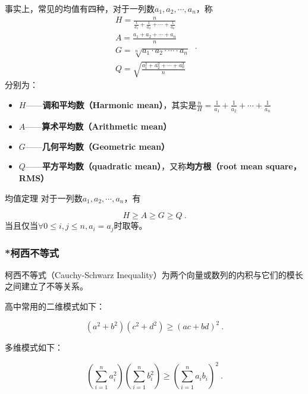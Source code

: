 事实上，常见的均值有四种，对于一列数$a_1,a_2,\cdots,a_n$，称
\begin{equation}
\begin{array}{c} 
\displaystyle H = \frac{n}{\frac{1}{a_1} + \frac{1}{a_2} + \cdots + \frac{1}{a_n}}\\
\displaystyle A = \frac{a_1 + a_2 + \cdots + a_n}{n}\\
\displaystyle G = \sqrt[n]{a_1 \cdot a_2 \cdot \cdots \cdot a_n}\\
\displaystyle Q = \sqrt{\frac{a_1^2 + a_2^2 + \cdots + a_n^2}{n}}
\end{array}~.
\end{equation}
分别为：
\begin{itemize}
\item $H$——\textbf{调和平均数（Harmonic mean）}，其实是$\displaystyle \frac{n}{H} = \frac{1}{a_1} + \frac{1}{a_2} + \cdots + \frac{1}{a_n}$
\item $A$——\textbf{算术平均数（Arithmetic mean）}
\item $G$——\textbf{几何平均数（Geometric mean）}
\item $Q$——\textbf{平方平均数（quadratic mean）}，又称\textbf{均方根（root mean square，RMS）}
\end{itemize}

\begin{theorem}{均值定理}
对于一列数$a_1,a_2,\cdots,a_n$，有

\begin{equation}
H\geq A\geq G\geq Q~.
\end{equation}
当且仅当$\forall 0\leq i,j\leq n,a_i=a_j$时取等。
\end{theorem}


\subsubsection{*柯西不等式}

柯西不等式（Cauchy-Schwarz Inequality）为两个向量或数列的内积与它们的模长之间建立了不等关系。

高中常用的二维模式如下：

\begin{equation}
\left( a^2 + b^2\right) \left(c^2 + d^2 \right) \geq \left( ac+bd \right)^2~.
\end{equation}

多维模式如下：

\begin{equation}
\left( \sum_{i=1}^{n} a_i^2 \right) \left( \sum_{i=1}^{n} b_i^2 \right) \geq \left( \sum_{i=1}^{n} a_i b_i \right)^2~.
\end{equation}

